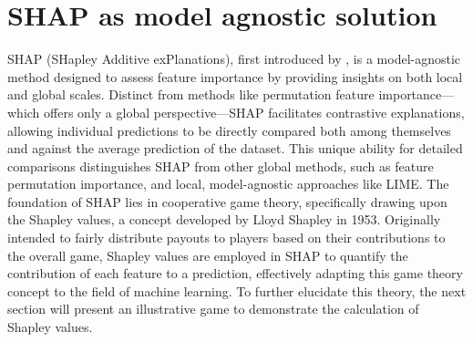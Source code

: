 \documentclass[12pt]{article}
\begin{document}
 \section{SHAP as model agnostic solution}
 SHAP (SHapley Additive exPlanations), first introduced by \cite{10.5555/3295222.3295230}, is a model-agnostic method designed to assess feature importance by providing insights on both local and global scales. Distinct from methods like permutation feature importance—which offers only a global perspective—SHAP facilitates contrastive explanations, allowing individual predictions to be directly compared both among themselves and against the average prediction of the dataset. This unique ability for detailed comparisons distinguishes SHAP from other global methods, such as feature permutation importance, and local, model-agnostic approaches like LIME.
 The foundation of SHAP lies in cooperative game theory, specifically drawing upon the Shapley values, a concept developed by Lloyd Shapley in 1953. Originally intended to fairly distribute payouts to players based on their contributions to the overall game, Shapley values are employed in SHAP to quantify the contribution of each feature to a prediction, effectively adapting this game theory concept to the field of machine learning. To further elucidate this theory, the next section will present an illustrative game to demonstrate the calculation of Shapley values.
\end{document}
